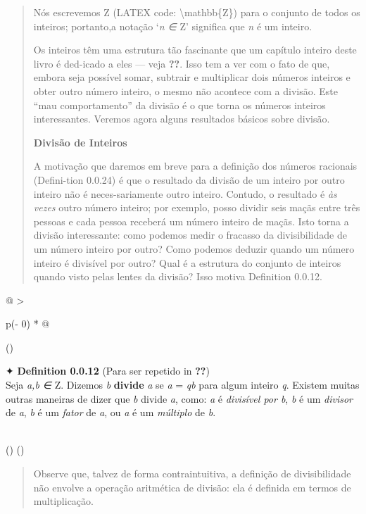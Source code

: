 \documentclass[
]{article}
\begin{document}
\begin{quote}
Nós escrevemos Z (LATEX code: \textbackslash mathbb\{Z\}) para o
conjunto de todos os inteiros; portanto,a notação `\emph{n ∈} Z'
significa que \emph{n} é um inteiro.

Os inteiros têm uma estrutura tão fascinante que um capítulo inteiro
deste livro é ded-icado a eles --- veja \textbf{??}. Isso tem a ver com
o fato de que, embora seja possível somar, subtrair e multiplicar dois
números inteiros e obter outro número inteiro, o mesmo não acontece com
a divisão. Este ``mau comportamento'' da divisão é o que torna os
números inteiros interessantes. Veremos agora alguns resultados básicos
sobre divisão.

\textbf{Divisão de Inteiros}

A motivação que daremos em breve para a definição dos números racionais
(Defini-tion 0.0.24) é que o resultado da divisão de um inteiro por
outro inteiro não é neces-sariamente outro inteiro. Contudo, o resultado
é \emph{às vezes} outro número inteiro; por exemplo, posso dividir seis
maçãs entre três pessoas e cada pessoa receberá um número inteiro de
maçãs. Isto torna a divisão interessante: como podemos medir o fracasso
da divisibilidade de um número inteiro por outro? Como podemos deduzir
quando um número inteiro é divisível por outro? Qual é a estrutura do
conjunto de inteiros quando visto pelas lentes da divisão? Isso motiva
Definition 0.0.12.
\end{quote}

\begin{longtable}[]{@{}
  >{\raggedright\arraybackslash}p{(\columnwidth - 0\tabcolsep) * }@{}}
\toprule()
\begin{minipage}[b]{\linewidth}\raggedright
✦ \textbf{Definition 0.0.12} (Para ser repetido in \textbf{??})\\
Seja \emph{a,b ∈} Z. Dizemos \emph{b} \textbf{divide} \emph{a} se
\emph{a} = \emph{qb} para algum inteiro \emph{q}. Existem muitas outras
maneiras de dizer que \emph{b} divide \emph{a}, como: \emph{a} é
\emph{divisível por b}, \emph{b} é um \emph{divisor} de \emph{a},
\emph{b} é um \emph{fator} de \emph{a}, ou \emph{a} é um \emph{múltiplo}
de \emph{b}.\strut
\end{minipage} \\
\midrule()
\endhead
\bottomrule()
\end{longtable}

\begin{quote}
Observe que, talvez de forma contraintuitiva, a definição de
divisibilidade não envolve a operação aritmética de divisão: ela é
definida em termos de multiplicação.
\end{quote}
\end{document}
